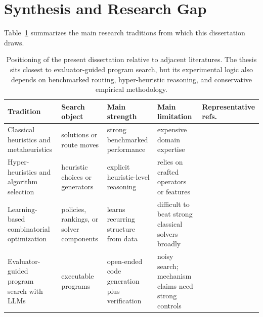 \section{Synthesis and Research Gap}
\label{sec:lit-gap}

Table~\ref{tab:lit-positioning} summarizes the main research traditions from which this
dissertation draws.

\begin{table}[t]
\centering
\scriptsize
\setlength{\tabcolsep}{4pt}
\begin{tabular}{
  >{\raggedright\arraybackslash}p{1.1in}
  >{\raggedright\arraybackslash}p{0.8in}
  >{\raggedright\arraybackslash}p{0.95in}
  >{\raggedright\arraybackslash}p{0.95in}
  >{\raggedright\arraybackslash}p{1.0in}
}
\toprule
Tradition & Search object & Main strength & Main limitation & Representative refs. \\
\midrule
Classical heuristics and metaheuristics & solutions or route moves & strong benchmarked performance & expensive domain expertise & \cite{lin1973,helsgaun2000,clarke1964,vidal2022hgs} \\
Hyper-heuristics and algorithm selection & heuristic choices or generators & explicit heuristic-level reasoning & relies on crafted operators or features & \cite{rice1976,burke2013,dokeroglu2024} \\
Learning-based combinatorial optimization & policies, rankings, or solver components & learns recurring structure from data & difficult to beat strong classical solvers broadly & \cite{bengio2021mlco,bello2016nco,khalil2017learning} \\
Evaluator-guided program search with LLMs & executable programs & open-ended code generation plus verification & noisy search; mechanism claims need strong controls & \cite{romeraparedes2024funsearch,mankowitz2023alphadev,liu2023lmea} \\
\bottomrule
\end{tabular}
\caption[Dissertation positioning relative to adjacent literatures]{Positioning of the present dissertation relative to adjacent literatures. The thesis sits
closest to evaluator-guided program search, but its experimental logic also depends on benchmarked
routing, hyper-heuristic reasoning, and conservative empirical methodology.}
\label{tab:lit-positioning}
\end{table}

